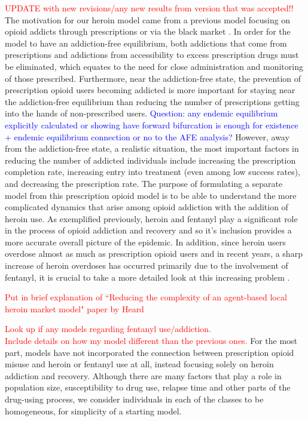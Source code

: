 \documentclass[12pt]{article}
\begin{document}
\textcolor{red}{UPDATE with new revisions/any new results from version that was accepted!!} The motivation for our heroin model came from a previous model focusing on opioid addicts through prescriptions or via the black market \cite{Battista}. In order for the model to have an addiction-free equilibrium, both addictions that come from prescriptions and addictions from accessibility to excess prescription drugs must be eliminated, which equates to the need for close administration and monitoring of those prescribed. Furthermore, near the addiction-free state, the prevention of prescription opioid users becoming addicted is more important for staying near the addiction-free equilibrium than reducing the number of prescriptions getting into the hands of non-prescribed users. \textcolor{blue}{Question: any endemic equilibrium explicitly calculated or showing have forward bifurcation is enough for existence + endemic equilibrium connection or no to the AFE analysis?} However, away from the addiction-free state, a realistic situation, the most important factors in reducing the number of addicted individuals include increasing the prescription completion rate, increasing entry into treatment (even among low success rates), and decreasing the prescription rate. The purpose of formulating a separate model from this prescription opioid model is to be able to understand the more complicated dynamics that arise among opioid addiction with the addition of heroin use. As exemplified previously, heroin and fentanyl play a significant role in the process of opioid addiction and recovery and so it's inclusion provides a more accurate overall picture of the epidemic. In addition, since heroin users overdose almost as much as prescription opioid users and in recent years, a sharp increase of heroin overdoses has occurred primarily due to the involvement of fentanyl, it is crucial to take a more detailed look at this increasing problem \cite{CDC4}. 

\textcolor{red}{Put in brief explanation of ``Reducing the complexity of an agent-based local heroin market model" paper by Heard} 

\textcolor{red}{Look up if any models regarding fentanyl use/addiction.} \\

\textcolor{red}{Include details on how my model different than the previous ones.} For the most part, models have not incorporated the connection between prescription opioid misuse and heroin or fentanyl use at all, instead focusing solely on heroin addiction and recovery. Although there are many factors that play a role in population size, susceptibility to drug use, relapse time and other parts of the drug-using process, we consider individuals in each of the classes to be homogeneous, for simplicity of a starting model. 
\end{document}

